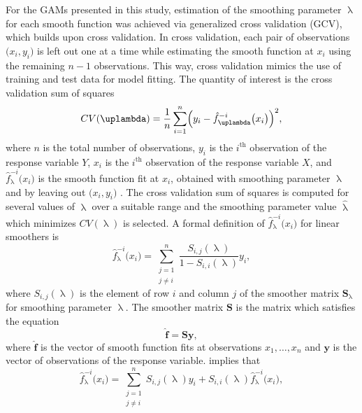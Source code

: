 For the GAMs presented in this study, estimation of the smoothing parameter \(\uplambda\) for each smooth function was achieved via generalized cross validation (GCV), which builds upon cross validation.  In cross validation, each pair of observations \(\bigl(x_i, y_i\bigr)\) is left out one at a time while estimating the smooth function at \(x_i\) using the remaining \(n - 1\) observations.  This way, cross validation mimics the use of training and test data for model fitting.  The quantity of interest is the cross validation sum of squares
\begin{equation}
  \label{eq:CrossValidationSumOfSquares01}
  CV(\uplambda) = \frac{1}{n} \sum_{i = 1}^n\Bigl(y_i - \hat{f}_\uplambda^{-i}\bigl(x_i\bigr)\Bigr)^2,
\end{equation}
where \(n\) is the total number of observations, \(y_i\) is the \(i^{\text{th}}\) observation of the response variable \(Y\), \(x_i\) is the \(i^{\text{th}}\) observation of the response variable \(X\), and \(\hat{f}_\uplambda^{-i}\bigl(x_i\bigr)\) is the smooth function fit at \(x_i\), obtained with smoothing parameter \(\uplambda\) and by leaving out \(\bigl(x_i, y_i\bigr)\) \parencite{Hastie1991}.  The cross validation sum of squares is computed for several values of \(\uplambda\) over a suitable range and the smoothing parameter value \(\hat{\uplambda}\) which minimizes \(CV(\uplambda)\) is selected.  A formal definition of \(\hat{f}_\uplambda^{-i}\bigl(x_i\bigr)\) for linear smoothers is
\begin{equation}
  \label{eq:CrossValidationFormalDefinitionOfJackknifedFit1}
  \hat{f}_\uplambda^{-i}\bigl(x_i\bigr) = \sum_{\substack{j = 1 \\ j \not = i}}^n \frac{S_{i, j}(\uplambda)}{1 - S_{i, i}(\uplambda)} y_i,
\end{equation}
where \(S_{i, j}(\uplambda)\) is the element of row \(i\) and column \(j\) of the smoother matrix \(\symbf{S}_\uplambda\) for smoothing parameter \(\uplambda\).  The smoother matrix \(\symbf{S}\) is the matrix which satisfies the equation
\begin{equation}
  \label{eq:SmootherMatrixDefinition}
  \hat{\symbf{f}} = \symbf{S} \symbf{y},
\end{equation}
where \(\hat{\symbf{f}}\) is the vector of smooth function fits at observations \(x_1, \ldots, x_n\) and \(\symbf{y}\) is the vector of observations of the response variable.
 implies that
\begin{equation}
  \label{eq:CrossValidationFormalDefinitionOfJackknifedFit2}
  \hat{f}_\uplambda^{-i}\bigl(x_i\bigr) = \sum_{\substack{j = 1 \\ j \not = i}}^n S_{i, j}(\uplambda) y_i +S_{i, i}(\uplambda) \hat{f}_\uplambda^{-i}\bigl(x_i\bigr),
\end{equation}

